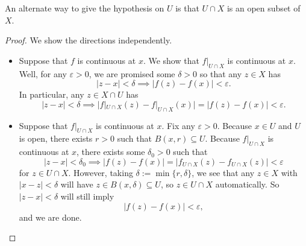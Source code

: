 An alternate way to give the hypothesis on $U$ is that $U\cap X$ is an open subset of $X$.
\begin{proof}
	We show the directions independently.
	\begin{itemize}
		\item Suppose that $f$ is continuous at $x$. We show that $f|_{U\cap X}$ is continuous at $x$. Well, for any $\varepsilon>0$, we are promised some $\delta>0$ so that any $z\in X$ has
		\[|z-x|<\delta\implies|f(z)-f(x)|<\varepsilon.\]
		In particular, any $z\in X\cap U$ has
		\[|z-x|<\delta\implies\big|f|_{U\cap X}(z)-f|_{U\cap X}(x)\big|=|f(z)-f(x)|<\varepsilon.\]
		\item Suppose that $f|_{U\cap X}$ is continuous at $x$. Fix any $\varepsilon>0$. Because $x\in U$ and $U$ is open, there exists $r>0$ such that $B(x,r)\subseteq U$. Because $f|_{U\cap X}$ is continuous at $x$, there exists some $\delta_0>0$ such that
		\[|z-x|<\delta_0\implies|f(z)-f(x)|=|f_{U\cap X}(z)-f_{U\cap X}(z)|<\varepsilon\]
		for $z\in U\cap X$. However, taking $\delta:=\min\{r,\delta\}$, we see that any $z\in X$ with $|x-z|<\delta$ will have $z\in B(x,\delta)\subseteq U$, so $z\in U\cap X$ automatically. So $|z-x|<\delta$ will still imply
		\[|f(z)-f(x)|<\varepsilon,\]
		and we are done.
		\qedhere
	\end{itemize}
\end{proof}